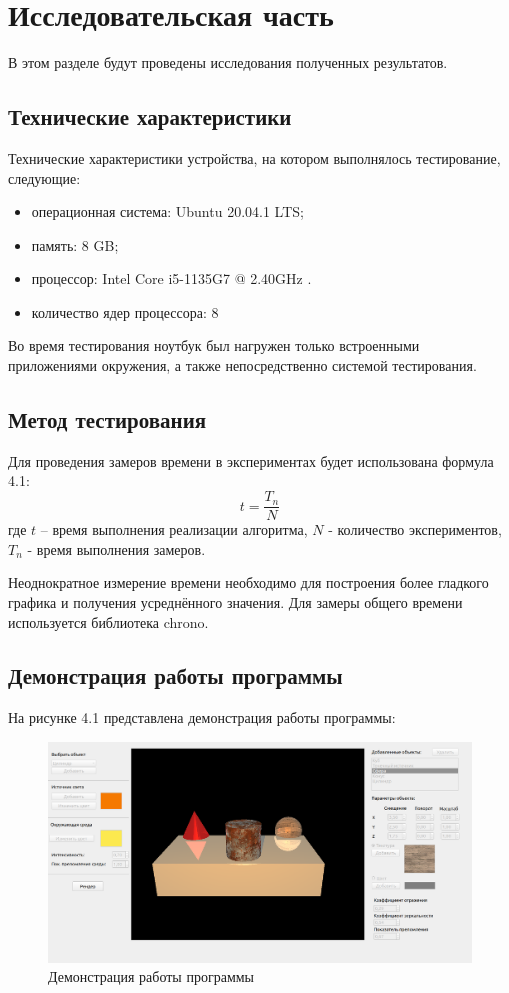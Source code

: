 \chapter{Исследовательская часть}
В этом разделе будут проведены исследования полученных результатов.
\section{Технические характеристики}
Технические характеристики устройства, на котором выполнялось тестирование, следующие:
\begin{itemize}
	\item операционная система: Ubuntu 20.04.1 LTS; \cite{ubuntu}
	\item память: 8 GB;
	\item процессор: Intel Core i5-1135G7 @ 2.40GHz \cite{intel}.
	\item количество ядер процессора: 8
\end{itemize}

Во время тестирования ноутбук был нагружен только встроенными приложениями окружения, а также непосредственно системой тестирования.

\section{Метод тестирования}
Для проведения замеров времени в экспериментах будет использована формула 4.1:
\begin{equation}
t = \frac{T_n}{N}
\end{equation}
где $t$ -- время выполнения реализации алгоритма, $N$ - количество экспериментов, $T_n$ - время выполнения замеров.

Неоднократное измерение времени необходимо для построения более гладкого графика и получения усреднённого значения.
Для замеры общего времени используется библиотека chrono.

\section{Демонстрация работы программы}
На рисунке 4.1 представлена демонстрация работы программы:
\FloatBarrier
\begin{figure}[h]
	\begin{center}
		\includegraphics[width=\linewidth]{inc/demonstrate.png}
	\end{center}
	\caption{Демонстрация работы программы}
\end{figure}
\FloatBarrier

